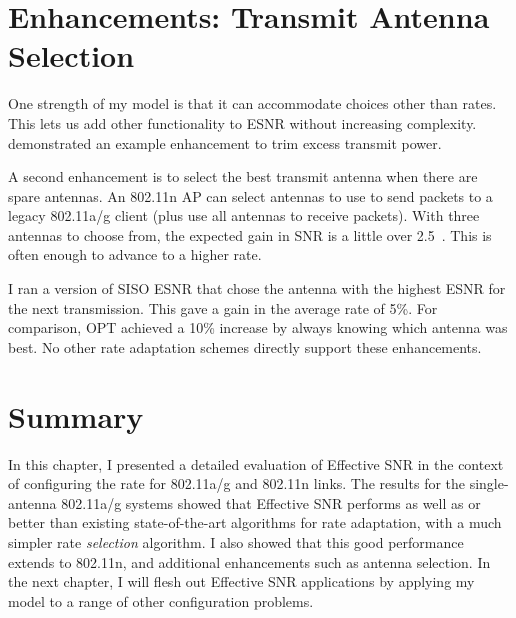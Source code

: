 \section{Enhancements: Transmit Antenna Selection}
One strength of my model is that it can accommodate choices other than rates. This lets us add other functionality to ESNR without increasing complexity.  demonstrated an example enhancement to trim excess transmit power.

A second enhancement is to select the best transmit antenna when there are spare antennas. An 802.11n AP can select antennas to use to send packets to a legacy 802.11a/g client (plus use all antennas to receive packets). With three antennas to choose from, the expected gain in SNR is a little over 2.5\dB~\cite{Goldsmith}. This is often enough to advance to a higher rate.

I ran a version of SISO ESNR that chose the antenna with the highest ESNR for the next transmission. This gave a gain in the average rate of 5\%.  For comparison, OPT achieved a 10\% increase by always knowing which antenna was best. No other rate adaptation schemes directly support these enhancements.

\section{Summary}
In this chapter, I presented a detailed evaluation of Effective SNR in the context of configuring the rate for 802.11a/g and 802.11n links. The results for the single-antenna 802.11a/g systems showed that Effective SNR performs as well as or better than existing state-of-the-art algorithms for rate adaptation, with a much simpler rate \emph{selection} algorithm. I also showed that this good performance extends to 802.11n, and additional enhancements such as antenna selection. In the next chapter, I will flesh out Effective SNR applications by applying my model to a range of other configuration problems.

\ifx\mainfile\undefined

\fi
